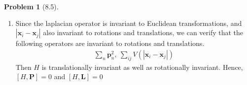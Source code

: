 \documentclass[twoside,11pt]{article}
\theoremstyle{definition}
\newtheorem{problem}{Problem}
\theoremstyle{remark}
\begin{document}
\begin{problem}[8.5]
\begin{enumerate}[label=(\alph*)]
\begin{proof}
\begin{align*}
    - 2\sum_{nj}\epsilon_{\alpha\beta\gamma}x_{n\beta}\left(
        i\hbar\frac{x_{n\gamma} - x_{j\gamma}}{r_{nj}^3} + \frac{1}{r_{nj}}p_{n\gamma}
    \right)\\
    &= -2i\hbar\sum_{nj}\epsilon_{\alpha\beta\gamma}x_{n\beta}\frac{x_{n\gamma}-x_{j\gamma}}{r_{nj}^3}
\end{align*}
Since
\begin{align*}
    \sum_{nj}\epsilon_{\alpha\beta\gamma}x_{n\beta}x_{n\gamma} &= 0\\
    \sum_{nj}\epsilon_{\alpha\beta\gamma}x_{n\beta}x_{j\gamma} &= 
    \sum_{n<j}\epsilon_{\alpha\beta\gamma}(x_{n\beta}x_{j\gamma} + x_{j\beta}x_{n\gamma})\\
    &=
    \sum_{n<j}\epsilon_{\alpha\beta\gamma}(x_{n\beta}x_{j\gamma} - x_{j\gamma}x_{n\beta})
    = 0
\end{align*}
Therefore we have
\begin{align*}
    \left[\sum_{nj}\frac{1}{r_{nj}}, \sum_n L_{n\alpha}\right] &= 0 \qedhere
\end{align*}
\end{proof}
According to these two claims, we have $[H,\mathbf{L}] = 0$.


\item Since the laplacian operator is invariant to Euclidean transformations,
and $|\mathbf{x}_i-\mathbf{x}_j|$ also invariant to rotations and translations,
we can verify that the following operators are invariant to rotations and translations.
\begin{align*}
    \sum_n \mathbf{p}_n^2,\
    \sum_{ij} V(|\mathbf{x}_i-\mathbf{x}_j|)
\end{align*}
Then $H$ is translationally invariant as well as rotationally invariant.
Hence, $[H, \mathbf{P}]=0$ and $[H,\mathbf{L}]=0$

\end{enumerate}
\end{problem}







\end{document}
